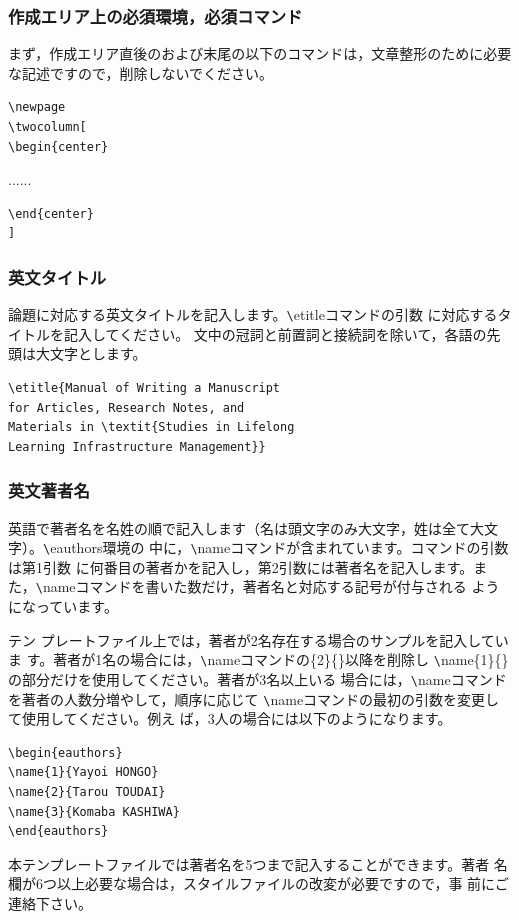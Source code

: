 \documentclass[b5paper,10pt,twocolumn,tombow]{jarticle}
\begin{document}
\subsubsection{作成エリア上の必須環境，必須コマンド}
まず，作成エリア直後のおよび末尾の以下のコマンドは，文章整形のために必要
な記述ですので，削除しないでください。
\begin{verbatim}
\newpage
\twocolumn[
\begin{center}
\end{verbatim}
......
\begin{verbatim}
\end{center}
]
\end{verbatim}


\subsubsection{英文タイトル}
論題に対応する英文タイトルを記入します。\verb|\|etitleコマンドの引数
に対応するタイトルを記入してください。
文中の冠詞と前置詞と接続詞を除いて，各語の先頭は大文字とします。


\begin{verbatim}
\etitle{Manual of Writing a Manuscript
for Articles, Research Notes, and
Materials in \textit{Studies in Lifelong
Learning Infrastructure Management}}
\end{verbatim}

\subsubsection{英文著者名}
英語で著者名を名姓の順で記入します（名は頭文字のみ大文字，姓は全て大文字）。\verb|\|eauthors環境の
中に，\verb|\|nameコマンドが含まれています。コマンドの引数は第1引数
に何番目の著者かを記入し，第2引数には著者名を記入します。ま
た，\verb|\|nameコマンドを書いた数だけ，著者名と対応する記号が付与される
ようになっています。


テン
プレートファイル上では，著者が2名存在する場合のサンプルを記入していま
す。著者が1名の場合には，\verb|\|nameコマンドの\{2\}\{\}以降を削除し
\verb|\|name\{1\}\{\}の部分だけを使用してください。著者が3名以上いる
場合には，\verb|\|nameコマンドを著者の人数分増やして，順序に応じて
\verb|\|nameコマンドの最初の引数を変更して使用してください。例え
ば，3人の場合には以下のようになります。
\begin{verbatim}
\begin{eauthors}
\name{1}{Yayoi HONGO}
\name{2}{Tarou TOUDAI}
\name{3}{Komaba KASHIWA}
\end{eauthors}
\end{verbatim}
本テンプレートファイルでは著者名を5つまで記入することができます。著者
名欄が6つ以上必要な場合は，スタイルファイルの改変が必要ですので，事
前にご連絡下さい。
\end{document}
